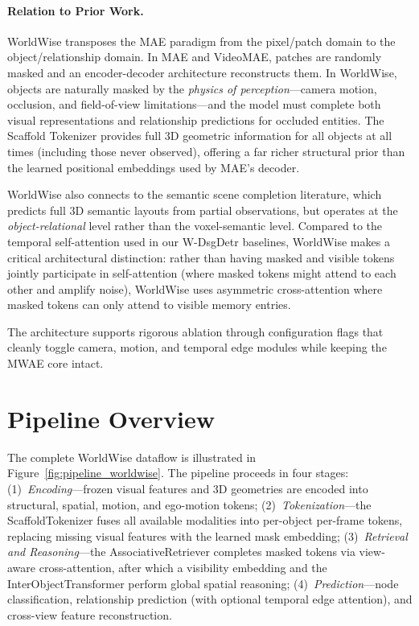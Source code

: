 \documentclass{article}
\begin{document}
\paragraph{Relation to Prior Work.}
WorldWise transposes the MAE paradigm from the pixel/patch domain to the object/relationship domain.  In MAE and VideoMAE, patches are randomly masked and an encoder-decoder architecture reconstructs them.  In WorldWise, objects are naturally masked by the \emph{physics of perception}---camera motion, occlusion, and field-of-view limitations---and the model must complete both visual representations and relationship predictions for occluded entities.  The Scaffold Tokenizer provides full 3D geometric information for all objects at all times (including those never observed), offering a far richer structural prior than the learned positional embeddings used by MAE's decoder.

WorldWise also connects to the semantic scene completion literature, which predicts full 3D semantic layouts from partial observations, but operates at the \emph{object-relational} level rather than the voxel-semantic level.  Compared to the temporal self-attention used in our W-DsgDetr baselines, WorldWise makes a critical architectural distinction: rather than having masked and visible tokens jointly participate in self-attention (where masked tokens might attend to each other and amplify noise), WorldWise uses asymmetric cross-attention where masked tokens can only attend to visible memory entries.

The architecture supports rigorous ablation through configuration flags that cleanly toggle camera, motion, and temporal edge modules while keeping the MWAE core intact.

\section{Pipeline Overview}
\label{sec:pipeline}

The complete WorldWise dataflow is illustrated in Figure~\ref{fig:pipeline_worldwise}.  The pipeline proceeds in four stages: (1)~\emph{Encoding}---frozen visual features and 3D geometries are encoded into structural, spatial, motion, and ego-motion tokens; (2)~\emph{Tokenization}---the ScaffoldTokenizer fuses all available modalities into per-object per-frame tokens, replacing missing visual features with the learned mask embedding; (3)~\emph{Retrieval and Reasoning}---the AssociativeRetriever completes masked tokens via view-aware cross-attention, after which a visibility embedding and the InterObjectTransformer perform global spatial reasoning; (4)~\emph{Prediction}---node classification, relationship prediction (with optional temporal edge attention), and cross-view feature reconstruction.
\end{document}
